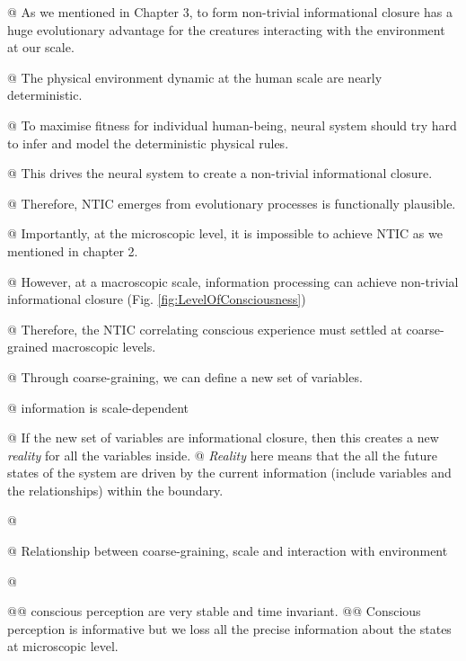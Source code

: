 \documentclass[utf8]{article}
\begin{document}
		\begin{WritingMaterials}
		
        @ As we mentioned in Chapter 3, to form non-trivial informational closure has a huge evolutionary advantage for the creatures interacting with the environment at our scale. 
        
        @ The physical environment dynamic at the human scale are nearly deterministic.
        
		@ To maximise fitness for individual human-being, neural system should try hard to infer and model the deterministic physical rules.

		@ This drives the neural system to create a non-trivial informational closure.
		
        @ Therefore, NTIC emerges from evolutionary processes is functionally plausible. 
        
        @ Importantly, at the microscopic level, it is impossible to achieve NTIC as we mentioned in chapter 2.

		@ However, at a macroscopic scale, information processing can achieve non-trivial informational closure (Fig. \ref{fig:LevelOfConsciousness})
        
        @ Therefore, the NTIC correlating conscious experience must settled at coarse-grained macroscopic levels.
        
		@ Through coarse-graining, we can define a new set of variables.

        @ information is scale-dependent
        
		@ If the new set of variables are informational closure, then this creates a new \textit{reality} for all the variables inside.        
		@ \textit{Reality} here means that the all the future states of the system are driven by the current information (include variables and the relationships) within the boundary. 
			
        @
        
        @ Relationship between coarse-graining, scale and interaction with environment
        
        
		@  \cite{price2007causation}

			@@ conscious perception are very stable and time invariant.
			@@ Conscious perception is informative but we loss all the precise information about the states at microscopic level.        
        

\end{WritingMaterials}
\end{document}
